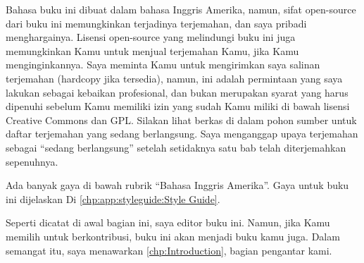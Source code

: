 Bahasa buku ini dibuat dalam bahasa Inggris Amerika, namun, sifat open-source
dari buku ini memungkinkan terjadinya terjemahan, dan saya pribadi
menghargainya.
Lisensi open-source yang melindungi buku ini juga memungkinkan Kamu
untuk menjual terjemahan Kamu, jika Kamu menginginkannya.
Saya meminta Kamu untuk mengirimkan saya salinan terjemahan (hardcopy jika
tersedia), namun, ini adalah permintaan yang saya lakukan sebagai
kebaikan profesional, dan bukan merupakan syarat yang harus dipenuhi
sebelum Kamu memiliki izin yang sudah Kamu miliki di bawah lisensi
Creative Commons dan GPL\@.
Silakan lihat berkas  di dalam pohon sumber untuk daftar
terjemahan yang sedang berlangsung.
Saya menganggap upaya terjemahan sebagai ``sedang berlangsung'' setelah
setidaknya satu bab telah diterjemahkan sepenuhnya.

Ada banyak gaya di bawah rubrik ``Bahasa Inggris Amerika''.
Gaya untuk buku ini dijelaskan Di
\cref{chp:app:styleguide:Style Guide}.

Seperti dicatat di awal bagian ini, saya editor buku ini.
Namun, jika Kamu memilih untuk berkontribusi, buku ini akan menjadi buku
kamu juga.
Dalam semangat itu, saya menawarkan \cref{chp:Introduction}, bagian
pengantar kami.

